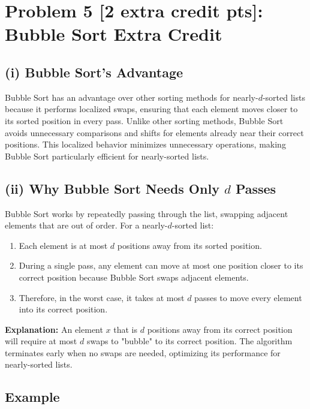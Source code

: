 \documentclass[10pt]{article}
\begin{document}
\newpage

\section*{Problem 5 [2 extra credit pts]: Bubble Sort Extra Credit}

\subsection*{(i) Bubble Sort's Advantage}

Bubble Sort has an advantage over other sorting methods for nearly-\( d \)-sorted lists because it performs localized swaps, ensuring that each element moves closer to its sorted position in every pass. Unlike other sorting methods, Bubble Sort avoids unnecessary comparisons and shifts for elements already near their correct positions. This localized behavior minimizes unnecessary operations, making Bubble Sort particularly efficient for nearly-sorted lists.

\subsection*{(ii) Why Bubble Sort Needs Only \( d \) Passes}

Bubble Sort works by repeatedly passing through the list, swapping adjacent elements that are out of order. For a nearly-\( d \)-sorted list:
\begin{enumerate}
  \item Each element is at most \( d \) positions away from its sorted position.
  \item During a single pass, any element can move at most one position closer to its correct position because Bubble Sort swaps adjacent elements.
  \item Therefore, in the worst case, it takes at most \( d \) passes to move every element into its correct position.
\end{enumerate}

\textbf{Explanation:} An element \( x \) that is \( d \) positions away from its correct position will require at most \( d \) swaps to "bubble" to its correct position. The algorithm terminates early when no swaps are needed, optimizing its performance for nearly-sorted lists.

\subsection*{Example}
\end{document}
